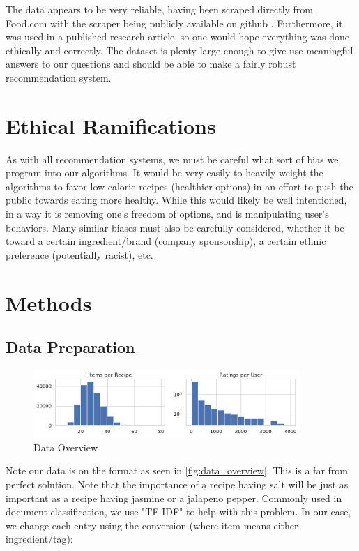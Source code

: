 \documentclass[11pt]{article}
\begin{document}
The data appears to be very reliable, having been scraped directly from Food.com with the scraper being publicly available on github \cite{data_scraper}. Furthermore, it was used in a published research article, so one would hope everything was done ethically and correctly. The dataset is plenty large enough to give use meaningful answers to our questions and should be able to make a fairly robust recommendation system.


\section{Ethical Ramifications}
As with all recommendation systems, we must be careful what sort of bias we program into our algorithms. It would be very easily to heavily weight the algorithms to favor low-calorie recipes (healthier options) in an effort to push the public towards eating more healthy. While this would likely be well intentioned, in a way it is removing one's freedom of options, and is manipulating user's behaviors. Many similar biases must also be carefully considered, whether it be toward a certain ingredient/brand (company sponsorship), a certain ethnic preference (potentially racist), etc.

\section{Methods}

\subsection{Data Preparation}
\begin{figure}[t]
\centering
\includegraphics[width=0.9\textwidth]{figs/dist.pdf}
\caption{Data Overview}
\label{fig:dist}
\end{figure}

Note our data is on the format as seen in \ref{fig:data_overview}. This is a far from perfect solution. Note that the importance of a recipe having salt will be just as important as a recipe having jasmine or a jalapeno pepper. Commonly used in document classification, we use "TF-IDF" to help with this problem. In our case, we change each entry using the conversion (where item means either ingredient/tag):
\end{document}

